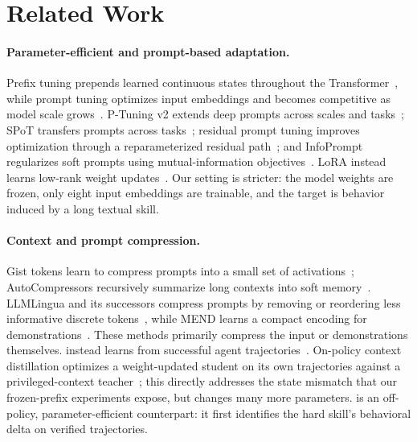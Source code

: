 \section{Related Work}

\paragraph{Parameter-efficient and prompt-based adaptation.}
Prefix tuning prepends learned continuous states throughout the Transformer~\citep{li2021prefix}, while prompt tuning optimizes input embeddings and becomes competitive as model scale grows~\citep{lester2021prompt}.  P-Tuning v2 extends deep prompts across scales and tasks~\citep{liu2022ptuningv2}; SPoT transfers prompts across tasks~\citep{vu2022spot}; residual prompt tuning improves optimization through a reparameterized residual path~\citep{razdaibiedina2023residual}; and InfoPrompt regularizes soft prompts using mutual-information objectives~\citep{wu2023infoprompt}.  LoRA instead learns low-rank weight updates~\citep{hu2022lora}.  Our setting is stricter: the model weights are frozen, only eight input embeddings are trainable, and the target is behavior induced by a long textual skill.

\paragraph{Context and prompt compression.}
Gist tokens learn to compress prompts into a small set of activations~\citep{mu2023gist}; AutoCompressors recursively summarize long contexts into soft memory~\citep{chevalier2023autocompressors}.  LLMLingua and its successors compress prompts by removing or reordering less informative discrete tokens~\citep{jiang2023llmlingua,jiang2024longllmlingua,pan2024llmlingua2}, while MEND learns a compact encoding for demonstrations~\citep{li2024mend}.  These methods primarily compress the input or demonstrations themselves.  \softskill instead learns from successful agent trajectories~\citep{tao2026softskill}.  On-policy context distillation optimizes a weight-updated student on its own trajectories against a privileged-context teacher~\citep{ye2026opcd}; this directly addresses the state mismatch that our frozen-prefix experiments expose, but changes many more parameters.  \method is an off-policy, parameter-efficient counterpart: it first identifies the hard skill's behavioral delta on verified trajectories.

